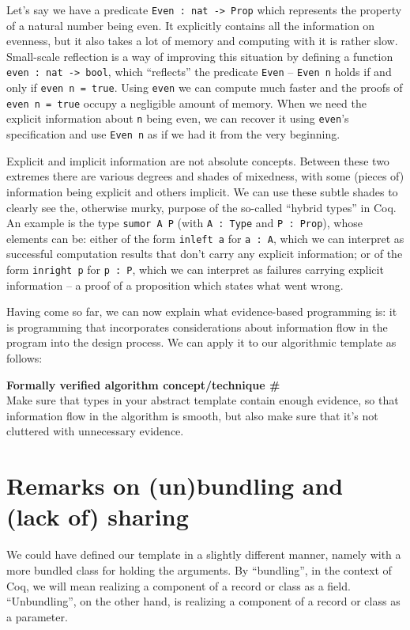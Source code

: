 \documentclass[declaration,mgr,english,shortabstract]{iithesis}
\newcommand{\m}[1]{\texttt{#1}}
\newcounter{cnt}
\newcommand{\runcnt}{\#\arabic{cnt}}
\newcommand{\concept}[1]
{
    \refstepcounter{cnt}
    \begin{center}
        \textbf{Formally verified algorithm concept/technique \runcnt} \\
        #1
    \end{center}
}
\begin{document}
Let's say we have a predicate \m{Even\ :\ nat -> Prop} which represents the property of a natural number being even. It explicitly contains all the information on evenness, but it also takes a lot of memory and computing with it is rather slow. Small-scale reflection is a way of improving this situation by defining a function \m{even\ :\ nat -> bool}, which ``reflects'' the predicate \m{Even} -- \m{Even n} holds if and only if \m{even n = true}. Using \m{even} we can compute much faster and the proofs of \m{even n = true} occupy a negligible amount of memory. When we need the explicit information about \m{n} being even, we can recover it using \m{even}'s specification and use \m{Even n} as if we had it from the very beginning.

Explicit and implicit information are not absolute concepts. Between these two extremes there are various degrees and shades of mixedness, with some (pieces of) information being explicit and others implicit. We can use these subtle shades to clearly see the, otherwise murky, purpose of the so-called ``hybrid types'' in Coq. An example is the type \m{sumor A P} (with \m{A\ :\ Type} and \m{P\ :\ Prop}), whose elements can be: either of the form \m{inleft a} for \m{a\ :\ A}, which we can interpret as successful computation results that don't carry any explicit information; or of the form \m{inright p} for \m{p\ :\ P}, which we can interpret as failures carrying explicit information -- a proof of a proposition which states what went wrong.

Having come so far, we can now explain what evidence-based programming is: it is programming that incorporates considerations about information flow in the program into the design process. We can apply it to our algorithmic template as follows:

\concept{Make sure that types in your abstract template contain enough evidence, so that information flow in the algorithm is smooth, but also make sure that it's not cluttered with unnecessary evidence.}

\section{Remarks on (un)bundling and (lack of) sharing}

We could have defined our template in a slightly different manner, namely with a more bundled class for holding the arguments. By ``bundling'', in the context of Coq, we will mean realizing a component of a record or class as a field. ``Unbundling'', on the other hand, is realizing a component of a record or class as a parameter.
\end{document}
